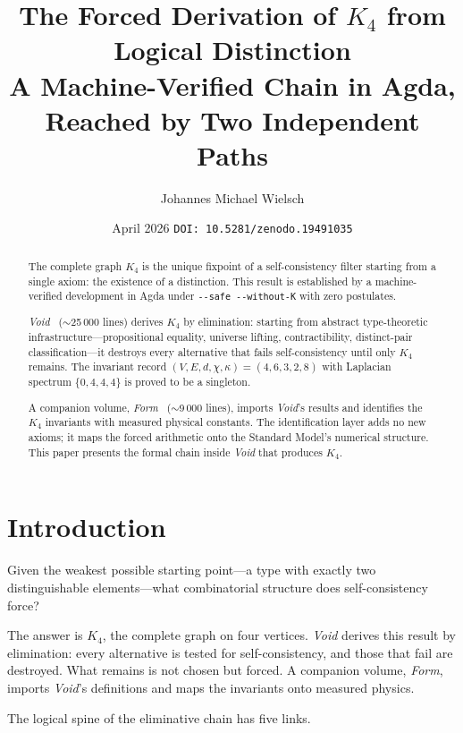 \documentclass[11pt,a4paper]{article}
\title{The Forced Derivation of $K_4$ from Logical Distinction\\[0.3em]
\large A Machine-Verified Chain in Agda, Reached by Two Independent Paths}
\author{Johannes Michael Wielsch}
\date{April 2026 \quad\texttt{DOI: 10.5281/zenodo.19491035}}
\theoremstyle{definition}
\begin{document}
\maketitle

\begin{abstract}
\noindent
The complete graph $K_4$ is the unique fixpoint of a self-consistency filter
starting from a single axiom: the existence of a distinction.  This result
is established by a machine-verified development in Agda under
\texttt{-{}-safe -{}-without-K} with zero postulates.

\textit{Void}~\cite{wielsch2026void} ($\sim$25\,000 lines) derives $K_4$ by
elimination: starting from abstract type-theoretic infrastructure---propositional
equality, universe lifting, contractibility, distinct-pair classification---it
destroys every alternative that fails self-consistency until only $K_4$ remains.
The invariant record $(V,E,d,\chi,\kappa) = (4,6,3,2,8)$ with Laplacian
spectrum $\{0,4,4,4\}$ is proved to be a singleton.

A companion volume, \textit{Form}~\cite{wielsch2026form} ($\sim$9\,000 lines),
imports \textit{Void}'s results and identifies the $K_4$ invariants with
measured physical constants.  The identification layer adds no new axioms;
it maps the forced arithmetic onto the Standard Model's numerical structure.
This paper presents the formal chain inside \textit{Void} that produces $K_4$.
\end{abstract}

\section{Introduction}
\label{sec:intro}

Given the weakest possible starting point---a type with exactly two
distinguishable elements---what combinatorial structure does self-consistency
force?

The answer is $K_4$, the complete graph on four vertices.  \textit{Void}
derives this result by elimination: every alternative is tested for
self-consistency, and those that fail are destroyed.  What remains is not
chosen but forced.  A companion volume, \textit{Form}, imports
\textit{Void}'s definitions and maps the invariants onto measured physics.

The logical spine of the eliminative chain has five links.
\end{document}
